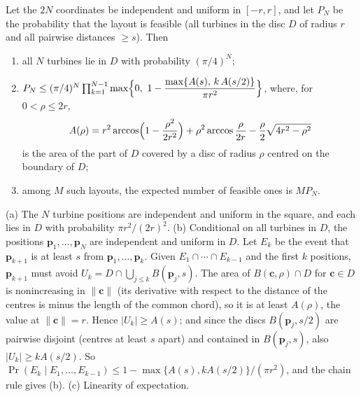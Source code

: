 \begin{thS}
\label{prop:S-box}
Let the $2N$ coordinates be independent and uniform in $[-r,r]$, and let $P_N$ be the probability that the layout is feasible (all turbines in the disc $D$ of radius $r$ and all pairwise distances $\ge s$). Then
\begin{enumerate}
\item[(a)] all $N$ turbines lie in $D$ with probability $(\pi/4)^N$;
\item[(b)] $P_N\le(\pi/4)^N\prod_{k=1}^{N-1}\max\Bigl\{0,\ 1-\dfrac{\max\{A(s),\,k\,A(s/2)\}}{\pi r^2}\Bigr\}$, where, for $0<\rho\le2r$,
\begin{equation}
A(\rho)=r^2\arccos\Bigl(1-\frac{\rho^2}{2r^2}\Bigr)+\rho^2\arccos\frac{\rho}{2r}-\frac{\rho}{2}\sqrt{4r^2-\rho^2}
\label{eq:S-th-lens}
\end{equation}
is the area of the part of $D$ covered by a disc of radius $\rho$ centred on the boundary of $D$;
\item[(c)] among $M$ such layouts, the expected number of feasible ones is $MP_N$.
\end{enumerate}
\end{thS}
\begin{thSproof}
(a) The $N$ turbine positions are independent and uniform in the square, and each lies in $D$ with probability $\pi r^2/(2r)^2$. (b) Conditional on all turbines in $D$, the positions $\mathbf p_1,\ldots,\mathbf p_N$ are independent and uniform in $D$. Let $E_k$ be the event that $\mathbf p_{k+1}$ is at least $s$ from $\mathbf p_1,\ldots,\mathbf p_k$. Given $E_1\cap\cdots\cap E_{k-1}$ and the first $k$ positions, $\mathbf p_{k+1}$ must avoid $U_k=D\cap\bigcup_{j\le k}B(\mathbf p_j,s)$. The area of $B(\mathbf c,\rho)\cap D$ for $\mathbf c\in D$ is nonincreasing in $\lVert\mathbf c\rVert$ (its derivative with respect to the distance of the centres is minus the length of the common chord), so it is at least $A(\rho)$, the value at $\lVert\mathbf c\rVert=r$. Hence $\lvert U_k\rvert\ge A(s)$; and since the discs $B(\mathbf p_j,s/2)$ are pairwise disjoint (centres at least $s$ apart) and contained in $B(\mathbf p_j,s)$, also $\lvert U_k\rvert\ge kA(s/2)$. So $\Pr(E_k\mid E_1,\ldots,E_{k-1})\le1-\max\{A(s),kA(s/2)\}/(\pi r^2)$, and the chain rule gives (b). (c) Linearity of expectation.
\end{thSproof}

